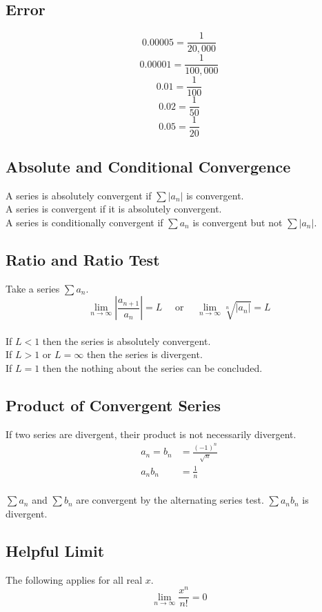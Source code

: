\documentclass[12pt]{article}
\begin{document}
\subsection{Error}

$$0.00005 = \frac{1}{20,000}$$
$$0.00001 = \frac{1}{100,000}$$
$$0.01 = \frac{1}{100}$$
$$0.02 = \frac{1}{50}$$
$$0.05 = \frac{1}{20}$$


\subsection{Absolute and Conditional Convergence}

A series is absolutely convergent if $\sum \left|a_n\right|$ is convergent.\\
A series is convergent if it is absolutely convergent.\\
A series is conditionally convergent if $\sum a_n$ is convergent but not $\sum \left|a_n\right|$.\\


\subsection{Ratio and Ratio Test}

Take a series $\sum a_n$.
\\
\begin{displaymath}
    \lim_{n\to\infty} \left|\frac{a_{n+1}}{a_n}\right| = L\quad\text{ or }\quad
    \lim_{n\to\infty} \sqrt[n]{\left|a_n\right|} = L
\end{displaymath}
\\
If $L < 1$ then the series is absolutely convergent.\\
If $L > 1\text{ or }L = \infty$ then the series is divergent.\\
If $L = 1$ then the nothing about the series can be concluded.


\subsection{Product of Convergent Series}

If two series are divergent, their product is not necessarily divergent.\\
\begin{align*}
    a_n = b_n &= \frac{(-1)^n}{\sqrt{n}}\\
    a_nb_n &= \frac{1}{n}
\end{align*}
\\
$\sum a_n$ and $\sum b_n$ are convergent by the alternating series test. $\sum a_nb_n$ is divergent.


\subsection{Helpful Limit}

The following applies for all real $x$.
$$
\lim_{n \to \infty} \frac{x^n}{n!} = 0
$$
\end{document}
